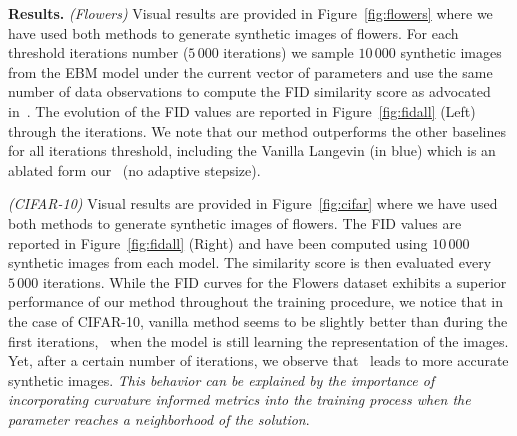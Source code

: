 \documentclass{article} %
\begin{document}
\medskip
\textbf{Results.} 
\textit{(Flowers)} \hspace{0.05in} Visual results are provided in Figure~\ref{fig:flowers} where we have used both methods to generate synthetic images of flowers.
For each threshold iterations number ($5\,000$ iterations) we sample $10\,000$ synthetic images from the EBM model under the current vector of parameters and use the same number of data observations to compute the FID similarity score as advocated in~\citet{heusel2017gans}.
The evolution of the FID values are reported in Figure~\ref{fig:fidall} (Left) through the iterations.
We note that our method outperforms the other baselines for all iterations threshold, including the Vanilla Langevin (in blue) which is an ablated form our \algo\ (no adaptive stepsize).




\textit{(CIFAR-10)} \hspace{0.05in} Visual results are provided in Figure~\ref{fig:cifar} where we have used both methods to generate synthetic images of flowers.
The FID values are reported in Figure~\ref{fig:fidall} (Right) and have been computed using $10\,000$ synthetic images from each model.
The similarity score is then evaluated every $5\,000$ iterations. 
While the FID curves for the Flowers dataset exhibits a superior performance of our method throughout the training procedure, we notice that in the case of CIFAR-10, vanilla method seems to be slightly better than \algo\. during the first iterations, \ie\ when the model is still learning the representation of the images.
Yet, after a certain number of iterations, we observe that \algo\ leads to more accurate synthetic images.
\emph{This behavior can be explained by the importance of incorporating curvature informed metrics into the training process when the parameter reaches a neighborhood of the solution}.
\end{document}
